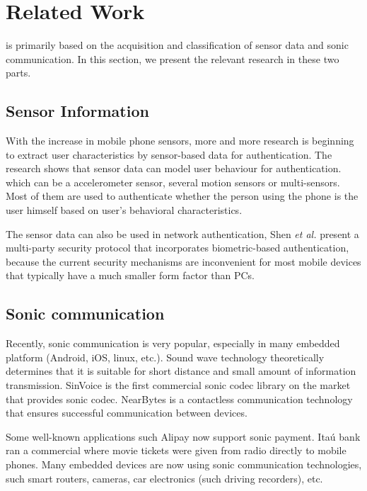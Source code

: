 \section{Related Work}
\label{sec:related}

\Name is primarily based on the acquisition and classification of sensor data and sonic communication. In this section, we present the relevant research in these two parts. 

\subsection{Sensor Information}

With the increase in mobile phone sensors, more and more research is beginning to extract user characteristics by sensor-based data for authentication. The research shows that sensor data can model user behaviour\cite{kayacik2014data} for authentication. which can be a accelerometer sensor\cite{hoang2015gait}, several motion sensors\cite{shen2018performance} or multi-sensors\cite{lee2015multi}. Most of them are used to authenticate whether the person using the phone is the user himself\cite{li2018sensor} based on user's behavioral characteristics\cite{lee2016implicit}.

The sensor data can also be used in network authentication, Shen \emph{et al.} present a multi-party security protocol that incorporates biometric-based authentication\cite{shen2018usable}, because the current security mechanisms are inconvenient for most mobile devices that typically have a much smaller form factor than PCs.




\subsection{Sonic communication}
Recently, sonic communication is very popular, especially in many embedded platform (Android, iOS, linux, etc.). Sound wave technology theoretically determines that it is suitable for short distance and small amount of information transmission. SinVoice is the first commercial sonic codec library on the market that provides sonic codec\cite{sinvoice}. NearBytes is a contactless communication technology that ensures successful communication between devices\cite{nearbytes}.

Some well-known applications such Alipay now support sonic payment\cite{alipay}. Ita{{\'u}} bank ran a commercial where movie tickets were given from radio directly to mobile phones\cite{tickets}. Many embedded devices are now using sonic communication technologies, such smart routers, cameras, car electronics (such driving recorders), etc.


